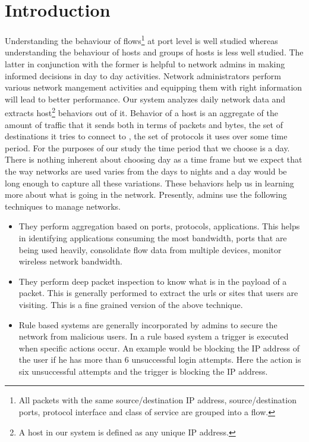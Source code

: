 
\chapter{Introduction}

Understanding the behaviour of flows\footnote{All packets with the same source/destination IP address, source/destination ports, protocol interface and class of service are grouped into a flow.} at port level is well studied whereas understanding the behaviour of hosts and groups of hosts is less well studied. The latter in conjunction with the former is helpful to network admins in making informed decisions in day to day activities. Network administrators perform various network mangement activities and equipping them with right information will lead to better performance. 
Our system analyzes daily network data and extracts host\footnote{A host in our system is defined as any unique IP address.} behaviors out of it.  Behavior of a host is an aggregate of the amount of traffic that it sends both in terms of packets and bytes, the set of destinations it tries to connect to , the set of protocols it uses over some time period. For the purposes of our study the time period that we choose is a day. There is nothing inherent about choosing day as a time frame but we expect that the way networks are used varies from the days to nights and a day would be long enough to capture all these variations. These behaviors help us in learning more about what is going in the network. Presently, admins use the following techniques to manage networks. 
\begin{itemize}
	\item They perform aggregation based on ports, protocols, applications. This helps in identifying applications consuming the most bandwidth, ports that are being used heavily, consolidate flow data from multiple devices, monitor wireless network bandwidth.	
	\item They perform deep packet inspection to know what is in the payload of a packet. This is generally performed to extract the urls or sites that users are  visiting. This is a fine grained version of the above technique.	
	\item Rule based systems are generally incorporated by admins to secure the network from malicious users. In a rule based system a trigger is executed when specific actions occur. An example would be blocking the IP address of the user if he has more than 6 unsuccessful login attempts. Here the action is six unsuccessful attempts and the trigger is blocking the IP address. 
\end{itemize}

